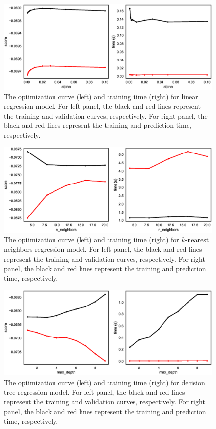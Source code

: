 \documentclass[12pt]{article}
\begin{document}
\begin{figure}[!ht]
	\centering
	\includegraphics[width=0.9\linewidth]{pic/linear_regression_opt}
	\caption{The optimization curve (left) and training time (right) for linear regression model. For left panel, the black and red lines represent the training and validation curves, respectively. For right panel, the black and red lines represent the training and prediction time, respectively.}
	\label{fig:linear_regression_opt}
\end{figure}

\begin{figure}[!ht]
	\centering
	\includegraphics[width=0.9\linewidth]{pic/knn_opt}
	\caption{The optimization curve (left) and training time (right) for $k$-nearest neighbors regression model. For left panel, the black and red lines represent the training and validation curves, respectively. For right panel, the black and red lines represent the training and prediction time, respectively.}
	\label{fig:knn_opt}
\end{figure}

\begin{figure}[!ht]
	\centering
	\includegraphics[width=0.9\linewidth]{pic/decision_tree_opt}
	\caption{The optimization curve (left) and training time (right) for decision tree regression model. For left panel, the black and red lines represent the training and validation curves, respectively. For right panel, the black and red lines represent the training and prediction time, respectively.}
	\label{fig:decision_tree_opt}
\end{figure}
\end{document}
